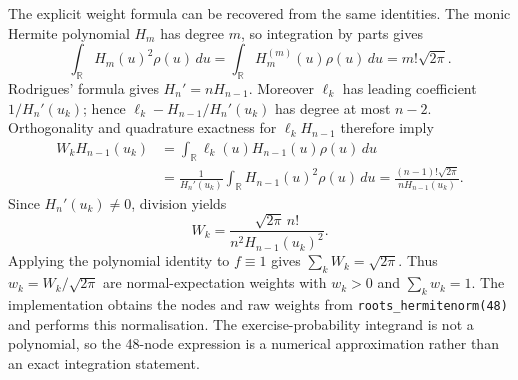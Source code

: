 \documentclass[11pt,a4paper]{article}
\theoremstyle{remark}
\begin{document}
The explicit weight formula can be recovered from the same identities. The monic Hermite polynomial $H_m$ has degree $m$, so integration by parts gives
\begin{equation}
 \int_{\mathbb R}H_m(u)^2\rho(u)\,du
 =\int_{\mathbb R}H_m^{(m)}(u)\rho(u)\,du
 =m!\sqrt{2\pi}.
\end{equation}
Rodrigues' formula gives $H_n'=nH_{n-1}$. Moreover $\ell_k$ has leading coefficient $1/H_n'(u_k)$; hence $\ell_k-H_{n-1}/H_n'(u_k)$ has degree at most $n-2$. Orthogonality and quadrature exactness for $\ell_kH_{n-1}$ therefore imply
\begin{align}
 W_kH_{n-1}(u_k)
 &=\int_{\mathbb R}\ell_k(u)H_{n-1}(u)\rho(u)\,du\nonumber\\
 &=\frac{1}{H_n'(u_k)}
       \int_{\mathbb R}H_{n-1}(u)^2\rho(u)\,du
 =\frac{(n-1)!\sqrt{2\pi}}{nH_{n-1}(u_k)}.
\end{align}
Since $H_n'(u_k)\ne0$, division yields
\begin{equation}
 W_k=\frac{\sqrt{2\pi}\,n!}{n^2H_{n-1}(u_k)^2}.
\end{equation}
Applying the polynomial identity to $f\equiv1$ gives $\sum_kW_k=\sqrt{2\pi}$. Thus $w_k=W_k/\sqrt{2\pi}$ are normal-expectation weights with $w_k>0$ and $\sum_kw_k=1$. The implementation obtains the nodes and raw weights from \texttt{roots\_hermitenorm(48)} and performs this normalisation. The exercise-probability integrand is not a polynomial, so the 48-node expression is a numerical approximation rather than an exact integration statement.
\end{document}

